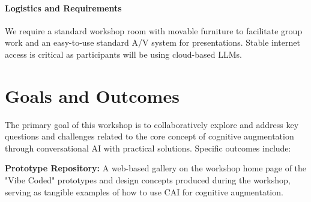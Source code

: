 \documentclass[manuscript,screen,review]{acmart}
\begin{document}


\paragraph*{Logistics and Requirements}
We require a standard workshop room with movable furniture to facilitate group work and an easy-to-use standard A/V system for presentations. Stable internet access is critical as participants will be using cloud-based LLMs. 

\section{Goals and Outcomes}

The primary goal of this workshop is to collaboratively explore and address key questions and challenges related to the core concept of cognitive augmentation through conversational AI with practical solutions. Specific outcomes include:

\noindent\textbf{Prototype Repository:} A web-based gallery on the workshop home page of the "Vibe Coded" prototypes and design concepts produced during the workshop, serving as tangible examples of how to use CAI for cognitive augmentation.
 
\end{document}
